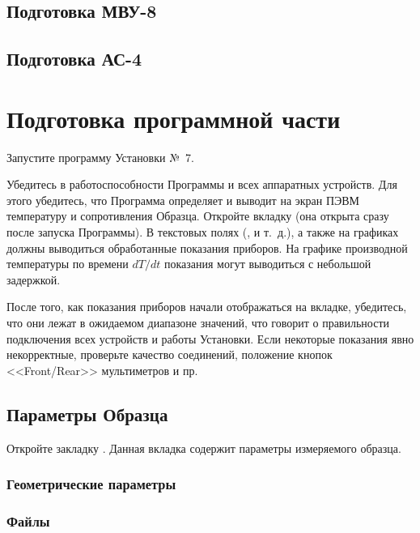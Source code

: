 \documentclass[12pt, a4paper, twocolumn]{report}
\begin{document}
\subsection{Подготовка МВУ-8}



\subsection{Подготовка АС-4}



\section{Подготовка программной части}

Запустите программу Установки №~7.

Убедитесь в работоспособности Программы и всех аппаратных устройств. Для этого убедитесь, что Программа определяет и выводит на экран ПЭВМ температуру и сопротивления Образца. Откройте вкладку  (она открыта сразу после запуска Программы). В текстовых полях (,  и т.~д.), а также на графиках должны выводиться обработанные показания приборов. На графике производной температуры по времени $dT/dt$ показания могут выводиться с небольшой задержкой.

После того, как показания приборов начали отображаться на вкладке, убедитесь, что они лежат в ожидаемом диапазоне значений, что говорит о правильности подключения всех устройств и работы Установки. Если некоторые показания явно некорректные, проверьте качество соединений, положение кнопок <<Front/Rear>> мультиметров и пр.

\subsection{Параметры Образца}

Откройте закладку . Данная вкладка содержит параметры измеряемого образца.

\subsubsection{Геометрические параметры}



\subsubsection{Файлы}
\end{document}
